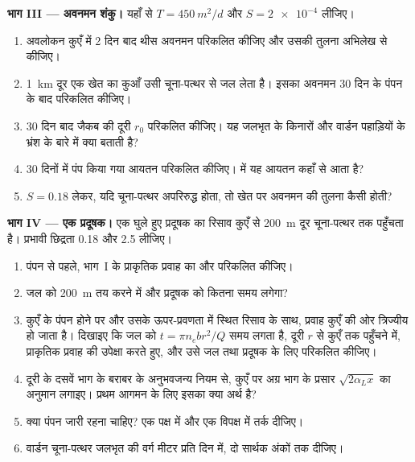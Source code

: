 \begin{problem}[{सप्ताहांत समस्या --- जलीय शीर्ष, एक पंपन परीक्षण और
परिरुद्ध वार्डन पहाड़ियों के चूना-पत्थर में एक प्रदूषक की यात्रा}]
\medskip\noindent\textbf{भाग III --- अवनमन शंकु।} यहाँ से $T =
\qty{450}{m^2/d}$ और $S = \num{2e-4}$ लीजिए।
\begin{enumerate}[resume]
\item अवलोकन कुएँ में 2 दिन बाद थीस अवनमन परिकलित कीजिए और
  उसकी तुलना अभिलेख से कीजिए।
\item \qty{1}{km} दूर एक खेत का कुआँ उसी चूना-पत्थर से जल लेता है। इसका
  अवनमन 30 दिन के पंपन के बाद परिकलित कीजिए।
\item 30 दिन बाद जैकब की दूरी $r_0$ परिकलित कीजिए। यह जलभृत के किनारों
  और वार्डन पहाड़ियों के भ्रंश के बारे में क्या बताती है?
\item 30 दिनों में पंप किया गया आयतन परिकलित कीजिए।  में
  यह आयतन कहाँ से आता है?
\item $S = 0.18$ लेकर, यदि चूना-पत्थर अपरिरुद्ध होता, तो खेत पर अवनमन की
  तुलना कैसी होती?
\end{enumerate}

\medskip\noindent\textbf{भाग IV --- एक प्रदूषक।} एक घुले हुए प्रदूषक का रिसाव
कुएँ से \qty{200}{m} दूर चूना-पत्थर तक पहुँचता है।
प्रभावी छिद्रता 0.18 और  2.5 लीजिए।
\begin{enumerate}[resume]
\item पंपन से पहले, भाग~I के प्राकृतिक प्रवाह का  और  परिकलित कीजिए।
\item जल को \qty{200}{m} तय करने में और प्रदूषक को
  कितना समय लगेगा?
\item कुएँ के पंपन होने पर और उसके ऊपर-प्रवणता में स्थित रिसाव के साथ, प्रवाह
  कुएँ की ओर त्रिज्यीय हो जाता है। दिखाइए कि जल को $t = \pi n_e b
  r^2/Q$ समय लगता है, दूरी $r$ से कुएँ तक पहुँचने में, प्राकृतिक प्रवाह की
  उपेक्षा करते हुए, और उसे जल तथा प्रदूषक के लिए परिकलित कीजिए।
\item दूरी के दसवें भाग के बराबर  के अनुभवजन्य नियम से,
  कुएँ पर अग्र भाग के प्रसार $\sqrt{2\alpha_Lx}$ का अनुमान लगाइए। प्रथम आगमन के लिए
  इसका क्या अर्थ है?
\item क्या पंपन जारी रहना चाहिए? एक पक्ष में और एक विपक्ष में तर्क दीजिए।
\item वार्डन चूना-पत्थर जलभृत की  वर्ग मीटर प्रति दिन में,
  दो सार्थक अंकों तक दीजिए।
\end{enumerate}
\end{problem}
